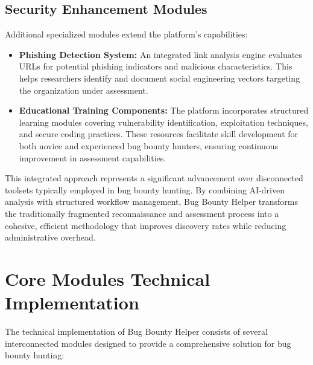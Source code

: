 \documentclass[conference]{IEEEtran}
\begin{document}
\subsection{Security Enhancement Modules}
Additional specialized modules extend the platform's capabilities:

\begin{itemize}
    \item \textbf{Phishing Detection System:} An integrated link analysis engine evaluates URLs for potential phishing indicators and malicious characteristics. This helps researchers identify and document social engineering vectors targeting the organization under assessment.
    
    \item \textbf{Educational Training Components:} The platform incorporates structured learning modules covering vulnerability identification, exploitation techniques, and secure coding practices. These resources facilitate skill development for both novice and experienced bug bounty hunters, ensuring continuous improvement in assessment capabilities.
\end{itemize}

This integrated approach represents a significant advancement over disconnected toolsets typically employed in bug bounty hunting. By combining AI-driven analysis with structured workflow management, Bug Bounty Helper transforms the traditionally fragmented reconnaissance and assessment process into a cohesive, efficient methodology that improves discovery rates while reducing administrative overhead.

\section{Core Modules Technical Implementation}
The technical implementation of Bug Bounty Helper consists of several interconnected modules designed to provide a comprehensive solution for bug bounty hunting:
\end{document}
